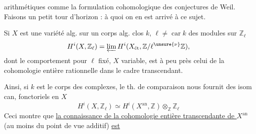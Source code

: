 arithmétiques comme la formulation cohomologique des conjectures de Weil.
Faisons un petit tour d'horizon : à quoi on en est arrivé à ce sujet.

Si $X$ est une variété alg. sur un corps alg. clos $k$,
\uline{$\ell\neq\operatorname{car} k$} des modules sur $\mathbb Z_\ell$
\[
H^i(X,\mathbb Z_\ell)=\varprojlim H^i(X_{\text{ét}},\mathbb Z/\ell^{\unsure{\nu}}\mathbb Z),
\]
dont le comportement pour $\ell$  fixé, $X$ variable, est à peu près celui de la cohomologie entière  rationnelle dans le cadre transcendant.

Ainsi, si $k$ est le corps des complexes, le th. de comparaison nous fournit des isom can, fonctoriels en $X$
\[
\boxed{H^i(X,\mathbb Z_\ell)\simeq H^i(X^{\mathrm{an}},\mathbb Z)\otimes_{\mathbb Z}\mathbb Z_\ell}
\]
Ceci montre que \uline{la connaissance de la cohomologie entière transcendante de $X^{\mathrm{an}}$} (au moins du point de vue additif) \uline{est}
